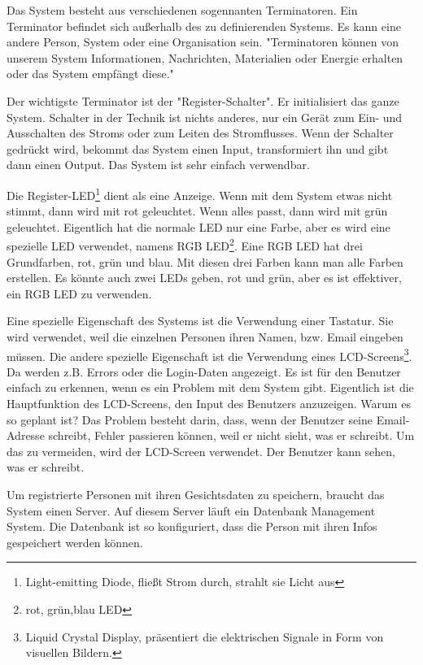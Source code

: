 Das System besteht aus verschiedenen sogennanten Terminatoren.
Ein  Terminator  befindet  sich  au{\ss}erhalb  des  zu  definierenden  Systems.  Es  kann  eine andere Person, System oder eine Organisation sein. "Terminatoren k\"onnen von unserem System Informationen, Nachrichten, Materialien oder Energie erhalten oder das System empf\"angt diese."\cite{terminator}

Der wichtigste Terminator ist der "Register-Schalter". Er initialisiert das ganze System. Schalter in der Technik ist nichts anderes, nur ein Ger\"at zum Ein- und Ausschalten des Stroms oder zum Leiten des Stromflusses. Wenn der Schalter gedr\"uckt wird, bekommt das System einen Input, transformiert ihn und gibt dann einen Output. Das System ist sehr einfach verwendbar.

Die Register-LED\footnote{Light-emitting Diode, flie{\ss}t Strom durch, strahlt sie Licht aus} dient als eine Anzeige. Wenn mit dem System etwas nicht stimmt, dann wird mit rot geleuchtet. Wenn alles passt, dann wird mit gr\"un geleuchtet. Eigentlich hat die normale LED nur eine Farbe, aber es wird eine spezielle LED verwendet, namens RGB LED\footnote{rot, gr\"un,blau LED}. Eine RGB LED hat drei Grundfarben, rot, gr\"un und blau. Mit diesen drei Farben kann man alle Farben erstellen. Es k\"onnte auch zwei LEDs geben, rot und gr\"un, aber es ist effektiver, ein RGB LED zu verwenden.


Eine spezielle Eigenschaft des Systems ist die Verwendung einer Tastatur. Sie wird verwendet, weil die einzelnen Personen ihren Namen, bzw. Email eingeben m\"ussen. 
Die andere spezielle Eigenschaft ist die Verwendung eines LCD-Screens\footnote{Liquid Crystal Display, präsentiert die elektrischen Signale in Form von visuellen Bildern.}. Da werden z.B. Errors oder die Login-Daten angezeigt. Es ist f\"ur den Benutzer einfach zu erkennen, wenn es ein Problem mit dem System gibt. Eigentlich ist die Hauptfunktion des LCD-Screens, den Input des Benutzers anzuzeigen. Warum es so geplant ist? Das Problem besteht darin, dass, wenn der Benutzer seine Email-Adresse schreibt, Fehler passieren k\"onnen, weil er nicht sieht, was er schreibt. Um das zu vermeiden, wird der LCD-Screen verwendet. Der Benutzer kann sehen, was er schreibt.

Um registrierte Personen mit ihren Gesichtsdaten zu speichern, braucht das System einen Server. Auf diesem Server l\"auft ein Datenbank Management System. Die Datenbank ist so konfiguriert, dass die Person mit ihren Infos gespeichert werden k\"onnen. 

